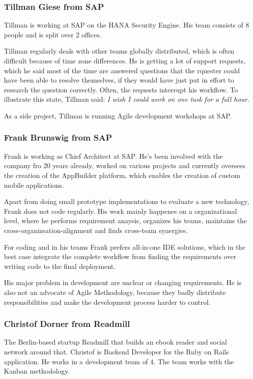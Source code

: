 \subsubsection{Tillman Giese from SAP}
Tillman is working at SAP on the HANA Security Engine. His team consists of 8 people and is split over 2 offices.

Tillman regularly deals with other teams globally distributed, which is often difficult because of time zone differences. He is getting a lot of support requests, which he said most of the time are answered questions that the rquester could have been able to resolve themselves, if they would have just put in effort to research the question correctly. Often, the requests interrupt his workflow. To illustrate this state, Tillman said: \emph{I wish I could work on one task for a full hour}.

As a side project, Tillman is running Agile development workshops at SAP.

\subsubsection{Frank Brunswig from SAP}
Frank is working as Chief Architect at SAP. He's been involved with the company fro 20 years already, worked on various projects and currently oversees the creation of the AppBuilder platform, which enables the creation of custom mobile applications.

Apart from doing small prototype implementations to evaluate a new technology, Frank does not code regularly. His work mainly happenes on a organizational level, where he performs requirement anaysis, organizes his teams, maintains the cross-organizsation-alignment and finds cross-team synergies.

For coding and in his teams Frank prefers all-in-one IDE solutions, which in the best case integrate the complete workflow from finding the requirements over writing code to the final deployment.

His major problem in development are unclear or changing requirements. He is also not an advocate of Agile Methodology, because they badly distribute responsibilities and make the development process harder to control.

\subsubsection{Christof Dorner from Readmill}
The Berlin-based startup Readmill that builds an ebook reader and social network around that. Christof is Backend Developer for the Ruby on Rails application. He works in a development team of 4. The team works with the Kanban methodology.


